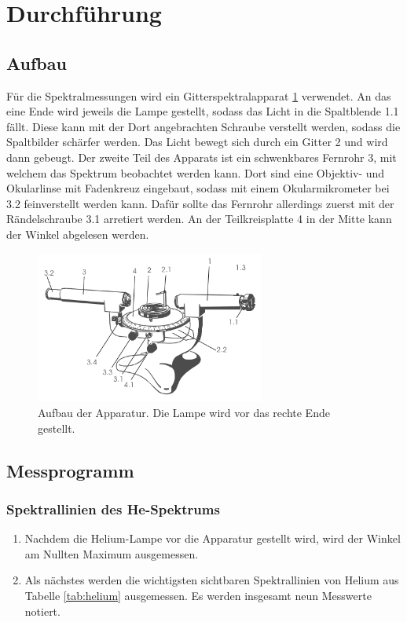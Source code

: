  \section{Durchführung}
\label{sec:Durchführung}

\subsection{Aufbau}

Für die Spektralmessungen wird ein Gitterspektralapparat \ref{fig:Gspa}
verwendet. An das eine Ende wird jeweils die Lampe gestellt, sodass das Licht
in die Spaltblende 1.1 fällt. Diese kann mit der Dort angebrachten Schraube
verstellt werden, sodass die Spaltbilder schärfer werden. Das Licht bewegt sich
durch ein Gitter 2 und wird dann gebeugt.
Der zweite Teil des Apparats ist ein schwenkbares Fernrohr 3, mit
welchem das Spektrum beobachtet werden kann. Dort sind eine Objektiv- und
Okularlinse mit Fadenkreuz eingebaut, sodass mit einem Okularmikrometer bei 3.2
feinverstellt werden kann. Dafür sollte das Fernrohr allerdings zuerst mit der
Rändelschraube 3.1 arretiert werden. An der Teilkreisplatte 4 in der
Mitte kann der Winkel abgelesen werden.

\begin{figure}
  \centering
  \includegraphics[height=5cm]{MeinFotoalbum:)/Apparatur.png}
  \caption{Aufbau der Apparatur. Die Lampe wird vor das rechte Ende gestellt.
  \cite{anleitung}}
  \label{fig:Gspa}
\end{figure}

\subsection{Messprogramm}

\subsubsection{Spektrallinien des He-Spektrums}

\begin{enumerate}

  \item Nachdem die Helium-Lampe vor die Apparatur gestellt wird, wird der
  Winkel am Nullten Maximum ausgemessen.

  \item Als nächstes werden die wichtigsten sichtbaren Spektrallinien
  von Helium aus Tabelle \ref{tab:helium} ausgemessen. Es werden insgesamt
  neun Messwerte notiert.

\end{enumerate}

